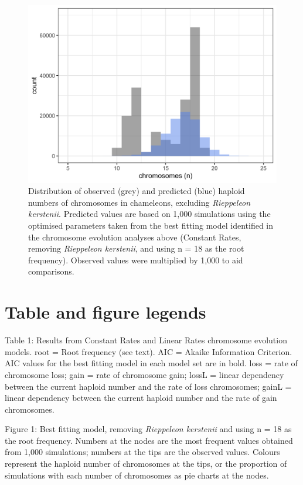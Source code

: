 \documentclass[a4paper, 12pt]{article}
\begin{document}
\newpage
\begin{figure}[h]
 \centering
  \includegraphics[width = \linewidth]{figures/chromevol-simulations-numbers-best.png}
  \caption{Distribution of observed (grey) and predicted (blue) haploid numbers of chromosomes in chameleons, excluding \textit{Rieppeleon kerstenii}. Predicted values are based on 1,000 simulations using the optimised parameters taken from the best fitting model identified in the chromosome evolution analyses above (Constant Rates, removing \textit{Rieppeleon kerstenii}, and using n = 18 as the root frequency). Observed values were multiplied by 1,000 to aid comparisons.
}
  \label{fig-predict}
\end{figure} 

\newpage
\section{Table and figure legends}

Table 1: Results from Constant Rates and Linear Rates chromosome evolution models. root = Root frequency (see text). AIC = Akaike Information Criterion. AIC values for the best fitting model in each model set are in bold. loss = rate of chromosome loss; gain = rate of chromosome gain; lossL = linear dependency between the current haploid number and the rate of loss chromosomes; gainL = linear dependency between the current haploid number and the rate of gain chromosomes.

Figure 1: Best fitting model, removing \textit{Rieppeleon kerstenii} and using n = 18 as the root frequency. Numbers at the nodes are the most frequent values obtained from 1,000 simulations; numbers at the tips are the observed values. Colours represent the haploid number of chromosomes at the tips, or the proportion of simulations with each number of chromosomes as pie charts at the nodes.
\end{document}
